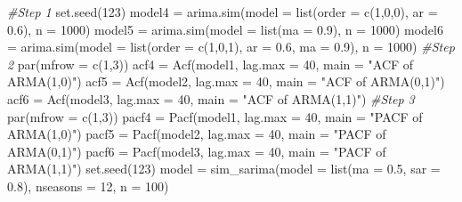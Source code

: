 \documentclass[
]{article}
\newenvironment{Shaded}{\begin{snugshade}}{\end{snugshade}}
\newcommand{\AttributeTok}[1]{\textcolor[rgb]{0.77,0.63,0.00}{#1}}
\newcommand{\CommentTok}[1]{\textcolor[rgb]{0.56,0.35,0.01}{\textit{#1}}}
\newcommand{\DecValTok}[1]{\textcolor[rgb]{0.00,0.00,0.81}{#1}}
\newcommand{\FloatTok}[1]{\textcolor[rgb]{0.00,0.00,0.81}{#1}}
\newcommand{\FunctionTok}[1]{\textcolor[rgb]{0.00,0.00,0.00}{#1}}
\newcommand{\NormalTok}[1]{#1}
\newcommand{\OtherTok}[1]{\textcolor[rgb]{0.56,0.35,0.01}{#1}}
\newcommand{\StringTok}[1]{\textcolor[rgb]{0.31,0.60,0.02}{#1}}
\begin{document}
\begin{Shaded}
\begin{Highlighting}[]
\CommentTok{\#Step 1}
\FunctionTok{set.seed}\NormalTok{(}\DecValTok{123}\NormalTok{)}
\NormalTok{model4 }\OtherTok{=} \FunctionTok{arima.sim}\NormalTok{(}\AttributeTok{model =} \FunctionTok{list}\NormalTok{(}\AttributeTok{order =} \FunctionTok{c}\NormalTok{(}\DecValTok{1}\NormalTok{,}\DecValTok{0}\NormalTok{,}\DecValTok{0}\NormalTok{), }\AttributeTok{ar =} \FloatTok{0.6}\NormalTok{), }\AttributeTok{n =} \DecValTok{1000}\NormalTok{)}
\NormalTok{model5 }\OtherTok{=} \FunctionTok{arima.sim}\NormalTok{(}\AttributeTok{model =} \FunctionTok{list}\NormalTok{(}\AttributeTok{ma =} \FloatTok{0.9}\NormalTok{), }\AttributeTok{n =} \DecValTok{1000}\NormalTok{)}
\NormalTok{model6 }\OtherTok{=} \FunctionTok{arima.sim}\NormalTok{(}\AttributeTok{model =} \FunctionTok{list}\NormalTok{(}\AttributeTok{order =} \FunctionTok{c}\NormalTok{(}\DecValTok{1}\NormalTok{,}\DecValTok{0}\NormalTok{,}\DecValTok{1}\NormalTok{), }\AttributeTok{ar =} \FloatTok{0.6}\NormalTok{, }\AttributeTok{ma =} \FloatTok{0.9}\NormalTok{), }\AttributeTok{n =} \DecValTok{1000}\NormalTok{)}
\CommentTok{\#Step 2}
\FunctionTok{par}\NormalTok{(}\AttributeTok{mfrow =} \FunctionTok{c}\NormalTok{(}\DecValTok{1}\NormalTok{,}\DecValTok{3}\NormalTok{))}
\NormalTok{acf4 }\OtherTok{=} \FunctionTok{Acf}\NormalTok{(model1, }\AttributeTok{lag.max =} \DecValTok{40}\NormalTok{, }\AttributeTok{main =} \StringTok{"ACF of ARMA(1,0)"}\NormalTok{)}
\NormalTok{acf5 }\OtherTok{=} \FunctionTok{Acf}\NormalTok{(model2, }\AttributeTok{lag.max =} \DecValTok{40}\NormalTok{, }\AttributeTok{main =} \StringTok{"ACF of ARMA(0,1)"}\NormalTok{)}
\NormalTok{acf6 }\OtherTok{=} \FunctionTok{Acf}\NormalTok{(model3, }\AttributeTok{lag.max =} \DecValTok{40}\NormalTok{, }\AttributeTok{main =} \StringTok{"ACF of ARMA(1,1)"}\NormalTok{)}
\CommentTok{\#Step 3}
\FunctionTok{par}\NormalTok{(}\AttributeTok{mfrow =} \FunctionTok{c}\NormalTok{(}\DecValTok{1}\NormalTok{,}\DecValTok{3}\NormalTok{))}
\NormalTok{pacf4 }\OtherTok{=} \FunctionTok{Pacf}\NormalTok{(model1, }\AttributeTok{lag.max =} \DecValTok{40}\NormalTok{, }\AttributeTok{main =} \StringTok{"PACF of ARMA(1,0)"}\NormalTok{)}
\NormalTok{pacf5 }\OtherTok{=} \FunctionTok{Pacf}\NormalTok{(model2, }\AttributeTok{lag.max =} \DecValTok{40}\NormalTok{, }\AttributeTok{main =} \StringTok{"PACF of ARMA(0,1)"}\NormalTok{)}
\NormalTok{pacf6 }\OtherTok{=} \FunctionTok{Pacf}\NormalTok{(model3, }\AttributeTok{lag.max =} \DecValTok{40}\NormalTok{, }\AttributeTok{main =} \StringTok{"PACF of ARMA(1,1)"}\NormalTok{)}
\FunctionTok{set.seed}\NormalTok{(}\DecValTok{123}\NormalTok{)}
\NormalTok{model }\OtherTok{=} \FunctionTok{sim\_sarima}\NormalTok{(}\AttributeTok{model =} \FunctionTok{list}\NormalTok{(}\AttributeTok{ma =} \FloatTok{0.5}\NormalTok{, }\AttributeTok{sar =} \FloatTok{0.8}\NormalTok{), }
                   \AttributeTok{nseasons =} \DecValTok{12}\NormalTok{, }\AttributeTok{n =} \DecValTok{100}\NormalTok{)}


\end{Highlighting}
\end{Shaded}
\end{document}
